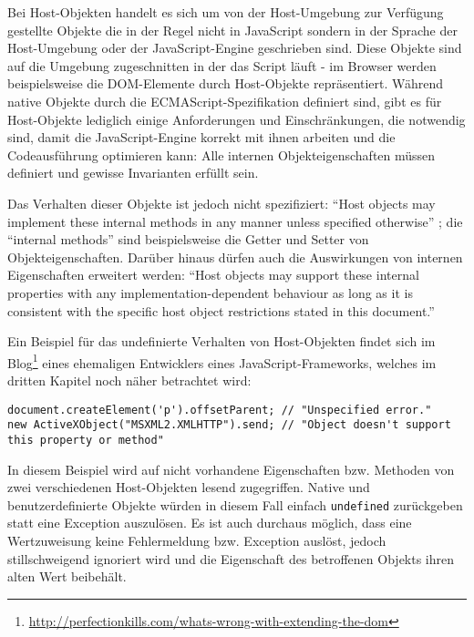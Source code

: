 Bei Host-Objekten handelt es sich um von der Host-Umgebung zur Verfügung gestellte Objekte die in
der Regel nicht in JavaScript sondern in der Sprache der Host-Umgebung oder der JavaScript-Engine
geschrieben sind. Diese Objekte sind auf die Umgebung zugeschnitten in der das Script läuft - im
Browser werden beispielsweise die DOM-Elemente durch Host-Objekte repräsentiert.
Während native Objekte durch die ECMAScript-Spezifikation definiert sind, gibt es für Host-Objekte
lediglich einige Anforderungen und Einschränkungen, die notwendig sind, damit die JavaScript-Engine
korrekt mit ihnen arbeiten und die Codeausführung optimieren kann: Alle internen Objekteigenschaften
müssen definiert und gewisse Invarianten erfüllt sein.

Das Verhalten dieser Objekte ist jedoch nicht
spezifiziert: \enquote{Host objects may implement these internal methods in any manner unless specified
otherwise} \citep[Kap. 8.6.2]{ecmascript}; die \enquote{internal methods} sind beispielsweise die Getter
und Setter von Objekteigenschaften. Darüber hinaus dürfen auch die Auswirkungen von internen
Eigenschaften erweitert werden: \enquote{Host objects may support these internal properties with any
implementation-dependent behaviour as long as it is consistent with the specific host object
restrictions stated in this document.} \citep[Kap. 8.6.2]{ecmascript}

Ein Beispiel für das undefinierte Verhalten von Host-Objekten findet sich im
Blog\footnote{\href{http://perfectionkills.com/whats-wrong-with-extending-the-dom}{http://perfectionkills.com/whats-wrong-with-extending-the-dom}}
eines ehemaligen Entwicklers eines JavaScript-Frameworks, welches im dritten Kapitel noch näher
betrachtet wird:

\begin{lstlisting}[caption=Verhalten von Host-Objekten im Internet Explorer]
document.createElement('p').offsetParent; // "Unspecified error."
new ActiveXObject("MSXML2.XMLHTTP").send; // "Object doesn't support this property or method"
\end{lstlisting}

In diesem Beispiel wird auf nicht vorhandene Eigenschaften bzw. Methoden von zwei verschiedenen
Host-Objekten lesend zugegriffen. Native und benutzerdefinierte Objekte würden in diesem Fall
einfach \lstinline{undefined} zurückgeben statt eine Exception auszulösen.
Es ist auch durchaus möglich, dass eine Wertzuweisung keine Fehlermeldung bzw. Exception auslöst,
jedoch stillschweigend ignoriert wird und die Eigenschaft des betroffenen Objekts ihren alten Wert
beibehält.


